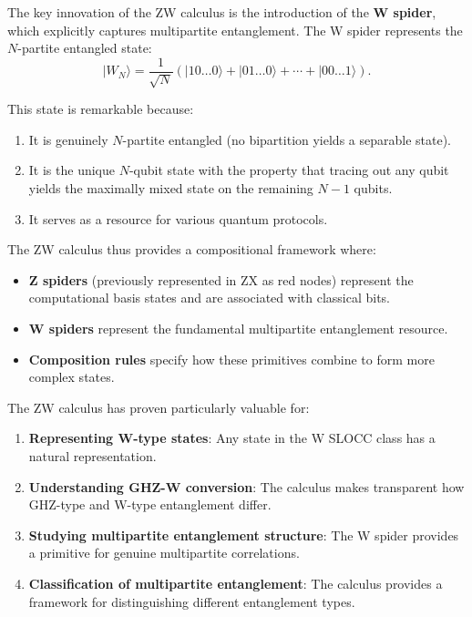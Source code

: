 \documentclass[12pt,a4paper]{article}
\begin{document}
The key innovation of the ZW calculus is the introduction of the \textbf{W spider}, which explicitly captures multipartite entanglement. The W spider represents the $N$-partite entangled state:
\begin{equation}
	|W_N\rangle = \frac{1}{\sqrt{N}}(|10\ldots 0\rangle + |01\ldots 0\rangle + \cdots + |00\ldots 1\rangle).
\end{equation}

This state is remarkable because:
\begin{enumerate}
	\item It is genuinely $N$-partite entangled (no bipartition yields a separable state).
	\item It is the unique $N$-qubit state with the property that tracing out any qubit yields the maximally mixed state on the remaining $N-1$ qubits.
	\item It serves as a resource for various quantum protocols.
\end{enumerate}

The ZW calculus thus provides a compositional framework where:
\begin{itemize}
	\item \textbf{Z spiders} (previously represented in ZX as red nodes) represent the computational basis states and are associated with classical bits.
	\item \textbf{W spiders} represent the fundamental multipartite entanglement resource.
	\item \textbf{Composition rules} specify how these primitives combine to form more complex states.
\end{itemize}

The ZW calculus has proven particularly valuable for:
\begin{enumerate}
	\item \textbf{Representing W-type states}: Any state in the W SLOCC class has a natural representation.
	\item \textbf{Understanding GHZ-W conversion}: The calculus makes transparent how GHZ-type and W-type entanglement differ.
	\item \textbf{Studying multipartite entanglement structure}: The W spider provides a primitive for genuine multipartite correlations.
	\item \textbf{Classification of multipartite entanglement}: The calculus provides a framework for distinguishing different entanglement types.
\end{enumerate}
\end{document}
